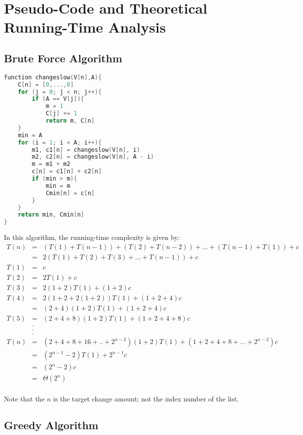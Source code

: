 \documentclass[11pt]{scrreprt}
\begin{document}
\section {Pseudo-Code and Theoretical Running-Time Analysis}


\subsection {Brute Force Algorithm}

\begin{lstlisting}[language=c]
function changeslow(V[n],A){
	C[n] = [0,...,0]
	for (j = 0; j < n; j++){
		if (A == V[j]){
			m = 1
			C[j] += 1
			return m, C[n]
	}
	min = A
	for (i = 1; i < A; i++){
		m1, c1[n] = changeslow(V[n], i)
		m2, c2[n] = changeslow(V[n], A - i)
		m = m1 + m2
		c[n] = c1[n] + c2[n]
		if (min > m){
			min = m
			Cmin[n] = c[n]
		}
	}
	return min, Cmin[n]
}
\end{lstlisting}

In this algorithm, the running-time complexity is given by:
\begin{eqnarray*}
T(n) 	& = & (T(1)+ T(n-1)) + (T(2) + T(n-2)) + ... + (T(n-1) + T(1)) + c\\
		& = & 2(T(1) + T(2) + T(3) + ... + T(n-1)) + c\\
T(1)	& = & c\\
T(2) 	& = & 2T(1) + c\\
T(3) 	& = & 2(1+2)T(1) + (1+2)c\\
T(4) 	& = & 2(1+2+2(1+2))T(1) + (1+2+4)c\\
	 	& = & (2+4)(1+2)T(1) + (1+2+4)c\\
T(5) 	& = & (2+4+8)(1+2)T(1) + (1+2+4+8)c\\
		& . & \\
		& . & \\
		& . & \\
T(n) 	& = & (2+4+8+16+..+2^{n-2})(1+2)T(1) + (1+2+4+8+...+2^{n-2})c\\
		& = & (2^{n-1}-2)T(1) + 2^{n-1}c\\
		& = & (2^n-2)c\\
		& = & \Theta(2^n)\\
\end{eqnarray*}

Note that the $n$ is the target change amount; not the index number of the list.

\subsection{Greedy Algorithm}
\end{document}
